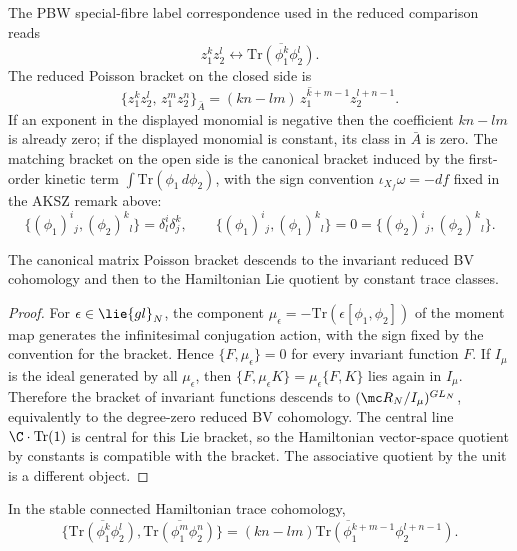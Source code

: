 \documentclass[11pt]{memoir}
\begin{document}
The PBW special-fibre label correspondence used in the reduced
comparison reads
$$z_1^kz_2^l \leftrightarrow
  \overline{\mathrm{Tr}(\phi_1^k\phi_2^l)}.$$
The reduced Poisson bracket on the closed side is
$$\{z_1^kz_2^l,\, z_1^mz_2^n\}_{\bar A}
  =\overline{(kn - lm)\,z_1^{k+m-1}z_2^{l+n-1}}.$$
If an exponent in the displayed monomial is negative then the coefficient
$kn-lm$ is already zero; if the displayed monomial is constant, its class in
$\bar A$ is zero.
The matching bracket on the open side is the canonical bracket induced by the
first-order kinetic term $\int\mathrm{Tr}(\phi_1\,d\phi_2)$, with the sign
convention $\iota_{X_f}\omega=-df$ fixed in the AKSZ remark above:
$$\{(\phi_1)^i{}_j,(\phi_2)^k{}_l\}
  =\delta^i_l\delta^k_j,\qquad
  \{(\phi_1)^i{}_j,(\phi_1)^k{}_l\}=0=\{(\phi_2)^i{}_j,(\phi_2)^k{}_l\}.$$

\begin{lem}\label{lem:trace-bracket-descends}
  The canonical matrix Poisson bracket descends to the invariant reduced BV
  cohomology and then to the Hamiltonian Lie quotient by constant trace
  classes.
\end{lem}

\begin{proof}
  For $\epsilon\in\lie{gl}_N$, the component
  $\mu_\epsilon=-\mathrm{Tr}(\epsilon[\phi_1,\phi_2])$ of the moment map
  generates the infinitesimal conjugation action, with the sign fixed by the
  convention for the bracket. Hence $\{F,\mu_\epsilon\}=0$ for every invariant
  function $F$. If $I_\mu$ is the ideal generated by all $\mu_\epsilon$, then
  $\{F,\mu_\epsilon K\}=\mu_\epsilon\{F,K\}$ lies again in $I_\mu$. Therefore
  the bracket of invariant functions descends to
  $(\mc R_N/I_\mu)^{GL_N}$, equivalently to the degree-zero reduced BV
  cohomology. The central line $\C\cdot\mathrm{Tr}(1)$ is central for this Lie
  bracket, so the Hamiltonian vector-space quotient by constants is compatible
  with the bracket. The associative quotient by the unit is a different
  object.
\end{proof}

\begin{prop}\label{prop:first-order-bracket}
  In the stable connected Hamiltonian trace cohomology,
  $$\{\overline{\mathrm{Tr}(\phi_1^k\phi_2^l)},
      \overline{\mathrm{Tr}(\phi_1^m\phi_2^n)}\}
    =\overline{(kn-lm)\mathrm{Tr}
      (\phi_1^{k+m-1}\phi_2^{l+n-1})}.$$
\end{prop}
\end{document}
